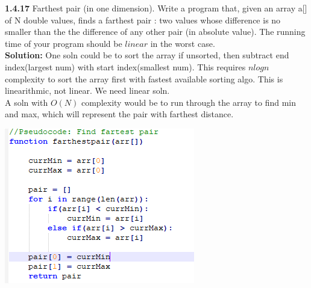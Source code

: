 \documentclass[11pt,fleqn]{article}
\begin{document}
\textbf{1.4.17} Farthest pair (in one dimension). Write a program that, given an array a[] of N
double values, finds a farthest pair : two values whose difference is no smaller than the
the difference of any other pair (in absolute value). The running time of your program
should be $linear$ in the worst case.\\

\textbf{Solution:}
One soln could be to sort the array if unsorted, then subtract end index(largest num) with start index(smallest num). This requires $nlogn$ complexity to sort the array first with fastest available sorting algo. This is linearithmic, not linear. We need linear soln. \\

A soln with $O(N)$ complexity would be to run through the array to find min and max, which will represent the pair with farthest distance.\\

\begin{center}
	\includegraphics[scale = 1]{1.4.17.png}
	\end{center}
\end{document}

